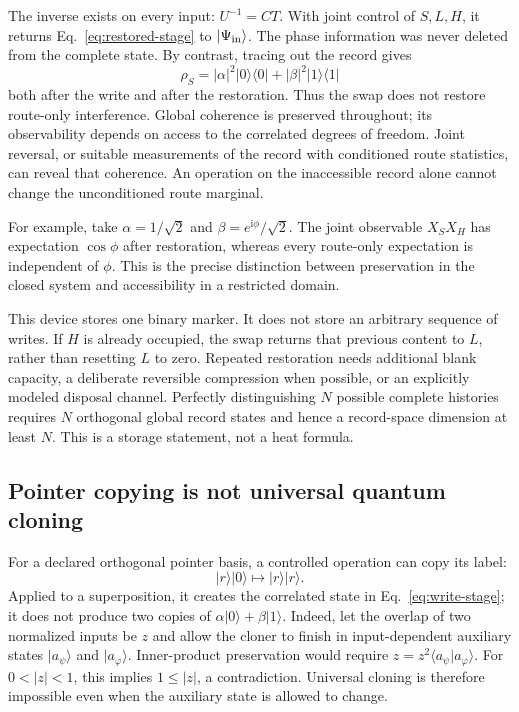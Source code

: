 The inverse exists on every input: $U^{-1}=C T$. With joint control of
$S,L,H$, it returns Eq.~\eqref{eq:restored-stage} to
$|\Psi_{\rm in}\rangle$. The phase information was never deleted from
the complete state. By contrast, tracing out the record gives
\begin{equation}
 \rho_S=|\alpha|^2|0\rangle\langle0|
          +|\beta|^2|1\rangle\langle1|
 \label{eq:restored-route-marginal}
\end{equation}
both after the write and after the restoration. Thus the swap does not
restore route-only interference. Global coherence is preserved throughout;
its observability depends on access to the correlated degrees of freedom.
Joint reversal, or suitable measurements of the record with conditioned
route statistics, can reveal that coherence. An operation on the
inaccessible record alone cannot change the unconditioned route marginal.

For example, take $\alpha=1/\sqrt2$ and $\beta=e^{\mathrm{i}\phi}/\sqrt2$.
The joint observable $X_S X_H$ has expectation $\cos\phi$ after restoration,
whereas every route-only expectation is independent of $\phi$.
This is the precise distinction between preservation in the closed system
and accessibility in a restricted domain.

This device stores one binary marker. It does not store an arbitrary
sequence of writes. If $H$ is already occupied, the swap returns that
previous content to $L$, rather than resetting $L$ to zero. Repeated
restoration needs additional blank capacity, a deliberate reversible
compression when possible, or an explicitly modeled disposal channel.
Perfectly distinguishing $N$ possible complete histories requires $N$
orthogonal global record states and hence a record-space dimension at
least $N$. This is a storage statement, not a heat formula.

\subsection{Pointer copying is not universal quantum cloning}

For a declared orthogonal pointer basis, a controlled operation can copy
its label:
\begin{equation}
 |r\rangle|0\rangle\longmapsto |r\rangle|r\rangle.
\end{equation}
Applied to a superposition, it creates the correlated state in
Eq.~\eqref{eq:write-stage}; it does not produce two copies of
$\alpha|0\rangle+\beta|1\rangle$. Indeed, let the overlap of two normalized inputs be $z$ and allow the
cloner to finish in input-dependent auxiliary states $|a_\psi\rangle$ and
$|a_\varphi\rangle$. Inner-product preservation would require
$z=z^2\langle a_\psi|a_\varphi\rangle$. For $0<|z|<1$, this implies
$1\le |z|$, a contradiction. Universal cloning is therefore impossible
even when the auxiliary state is allowed to change.

